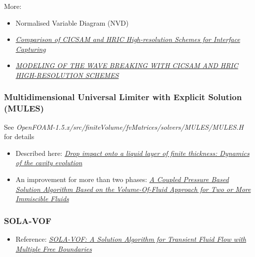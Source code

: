 \documentclass[]{report}
\begin{document}
More:
\begin{itemize}
    \item Normalised Variable Diagram (NVD)
    \item \textit{\href{http://warminski.pollub.plwww.ptmts.org.pl/Waclaw-Koron-2-08.pdf}{Comparison of CICSAM and HRIC High-resolution Schemes for Interface Capturing}}
    \item \textit{\href{http://proceedings.fyper.com/eccomascfd2006/documents/85.pdf}{MODELING OF THE WAVE BREAKING WITH CICSAM AND HRIC HIGH-RESOLUTION SCHEMES}}
\end{itemize}

\subsubsection{Multidimensional Universal Limiter with Explicit Solution (MULES)}

See \textit{OpenFOAM-1.5.x/src/finiteVolume/fvMatrices/solvers/MULES/MULES.H} for details


\begin{itemize}
    \item Described here: \textit{\href{http://link.libris.kb.se/sfxliub?sid=?url_ver=Z39.88-2004&rfr_id=info:sid/bibl.liu.se\%3Axerxes+\%28+PubMed+LiU\%29&rft.genre=article&rft_val_fmt=info\%3Aofi\%2Ffmt\%3Akev\%3Amtx\%3Ajournal&rft.issn=15393755&rft.date=2009&rft.jtitle=Phys+Rev+E+Stat+Nonlin+Soft+Matter+Phys&rft.volume=79&rft.issue=3+Pt+2&rft.spage=036306&rft.atitle=Drop+impact+onto+a+liquid+layer+of+finite+thickness+\%3A+dynamics+of+the+cavity+evolution+&rft.aulast=Berberovi\%C4\%87&rft.aufirst=Edin}{Drop impact onto a liquid layer of finite thickness: Dynamics of the cavity evolution}}
    \item An improvement for more than two phases: \textit{\href{http://www.mathematik.uni-ulm.de/numerik/staff/urban/reports/ECCOMASCFD2010paperfinal.pdf}{A Coupled Pressure Based Solution Algorithm Based on the Volume-Of-Fluid Approach for Two or More Immiscible Fluids}}
\end{itemize}

\subsubsection{SOLA-VOF}

\begin{itemize}
    \item Reference: \textit{\href{http://www.ewp.rpi.edu/hartford/~ernesto/Su2012/CFD/Readings/SOLA-VOF-1980-P1.pdf}{SOLA-VOF: A Solution Algorithm for Transient Fluid Flow with Multiple Free Boundaries}}
\end{itemize}
\end{document}
